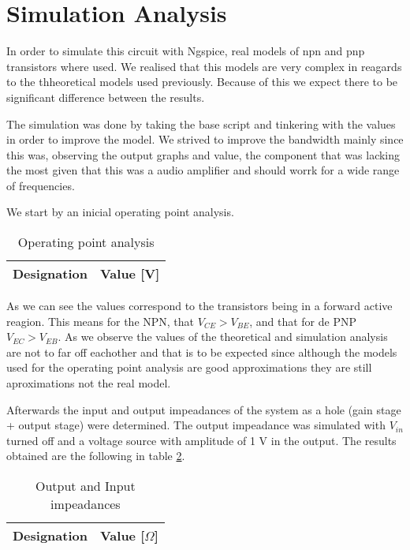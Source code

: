 \section{Simulation Analysis} \label{sec:simulation}

In order to simulate this circuit with Ngspice, real models of npn and pnp transistors where used. We realised that this models are very complex in reagards to the thheoretical models used previously. Because of this we expect there to be significant difference between the results.
\par
The simulation was done by taking the base script and tinkering with the values in order to improve the model. We strived to improve the bandwidth mainly since this was, observing the output graphs and value, the component that was lacking the most given that this was a audio amplifier and should worrk for a wide range of frequencies.

We start by an inicial operating point analysis.

\begin{table}[H]
  \centering
  \begin{tabular}{|c|c|}
    \hline
        {\bf Designation} & {\bf Value [V]} \\ \hline
        
  \end{tabular}
  \caption{Operating point analysis} 
  \label{tab:rip}
\end{table}

As we can see  the values correspond to the transistors being in a forward active reagion. This means for the NPN, that $V_{CE}>V_{BE}$, and that for de PNP $V_{EC}>V_{EB}$. As we observe the values of the theoretical and simulation analysis are not to far off eachother and that is to be expected since although the models used for the operating point analysis are good approximations they are still aproximations not the real model.
\par



Afterwards the input and output impeadances of the system as a hole (gain stage + output stage) were determined. The output impeadance was simulated with $V_{in}$ turned off and a voltage source with amplitude of 1 V in the output. The results obtained are the following in table \ref{tab:impe}.

\begin{table}[H]
  \centering
  \begin{tabular}{|c|c|}
    \hline
        {\bf Designation} & {\bf Value [$\Omega$]} \\ \hline
        
  \end{tabular}
  \caption{Output and Input impeadances} 
  \label{tab:impe}
\end{table}

